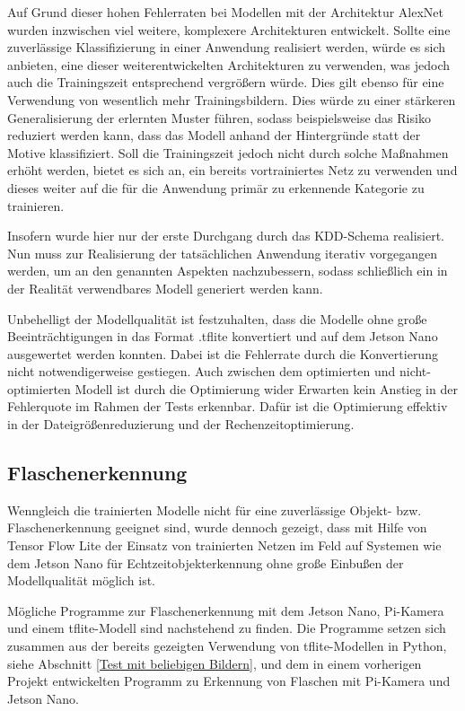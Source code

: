 Auf Grund dieser hohen Fehlerraten bei Modellen mit der Architektur AlexNet wurden inzwischen viel weitere, komplexere Architekturen entwickelt.  Sollte eine zuverlässige Klassifizierung in einer Anwendung realisiert werden, würde es sich anbieten, eine dieser weiterentwickelten Architekturen zu verwenden, was jedoch auch die Trainingszeit entsprechend vergrößern würde. Dies gilt ebenso für eine Verwendung von wesentlich mehr Trainingsbildern. Dies würde zu einer stärkeren Generalisierung der erlernten Muster führen, sodass beispielsweise das Risiko reduziert werden kann, dass das Modell anhand der Hintergründe statt der Motive klassifiziert. Soll die Trainingszeit jedoch nicht durch solche Maßnahmen erhöht werden, bietet es sich an, ein bereits vortrainiertes Netz zu verwenden und dieses weiter auf die für die Anwendung primär zu erkennende Kategorie zu trainieren.

Insofern wurde hier nur der erste Durchgang durch das KDD-Schema realisiert. Nun muss zur Realisierung der tatsächlichen Anwendung iterativ vorgegangen werden, um an den genannten Aspekten nachzubessern, sodass schließlich ein in der Realität verwendbares Modell generiert werden kann. 

Unbehelligt der Modellqualität ist festzuhalten, dass die Modelle ohne große Beeinträchtigungen in das Format .tflite konvertiert und auf dem Jetson Nano ausgewertet werden konnten. Dabei ist die Fehlerrate durch die Konvertierung nicht notwendigerweise gestiegen. Auch zwischen dem optimierten und nicht-optimierten Modell ist durch die Optimierung wider Erwarten kein Anstieg in der Fehlerquote im Rahmen der Tests erkennbar. Dafür ist die Optimierung effektiv in der Dateigrößenreduzierung und der Rechenzeitoptimierung.


\subsection{Flaschenerkennung}

Wenngleich die trainierten Modelle nicht für eine zuverlässige Objekt- bzw. Flaschenerkennung geeignet sind, wurde dennoch gezeigt, dass mit Hilfe von Tensor Flow Lite der Einsatz von trainierten Netzen im Feld auf Systemen wie dem Jetson Nano für Echtzeitobjekterkennung ohne große Einbußen der Modellqualität möglich ist.

Mögliche Programme zur Flaschenerkennung mit dem Jetson Nano, Pi-Kamera und einem tflite-Modell sind nachstehend zu finden. Die Programme setzen sich zusammen aus der bereits gezeigten Verwendung von tflite-Modellen in Python, siehe Abschnitt \ref{Test mit beliebigen Bildern}, und dem in einem vorherigen Projekt entwickelten Programm zu Erkennung von Flaschen mit Pi-Kamera und Jetson Nano. 

